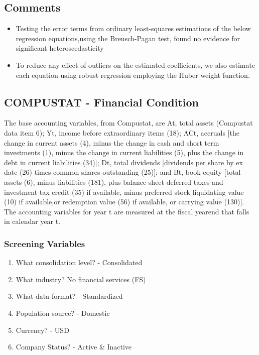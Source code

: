 \documentclass[12pt]{article}
\begin{document}
    \subsection{Comments}

    \begin{itemize}
        \item Testing the error terms from ordinary least-squares estimations of the below regression equations,using the Breusch-Pagan test, found no evidence for significant heteroscedasticity \citep{Brigida2012}
        \item To reduce any effect of outliers on the estimated coefficients, we also estimate each equation using robust regression employing the Huber weight function. \citep{Brigida2012}
    \end{itemize}

    \subsection{COMPUSTAT - Financial Condition}
    The base accounting variables, from Compustat, are At, total assets (Compustat data
    item 6); Yt, income before extraordinary items (18); ACt, accruals [the change in current assets (4), minus the change in cash and short term investments (1), minus the change in
    current liabilities (5), plus the change in debt in current liabilities (34)]; Dt, total dividends [dividends per share by ex date (26) times common shares outstanding (25)]; and Bt, book equity  [total assets (6), minus liabilities (181), plus balance sheet deferred taxes and
    investment tax credit (35) if available, minus preferred stock liquidating value (10) if available,or redemption value (56) if available, or carrying value (130)]. The accounting variables for year t are measured at the fiscal yearend that falls in calendar year t. \citep{Fama2006}
        \subsubsection{Screening Variables}

        \begin{enumerate}
            \item What consolidation level? - Consolidated
            \item What industry? No financial services (FS) 
            \item What data format?  - Standardized 
            \item Population source? - Domestic 
            \item Currency? - USD 
            \item Company Status? - Active \& Inactive  
        \end{enumerate}
\end{document}
